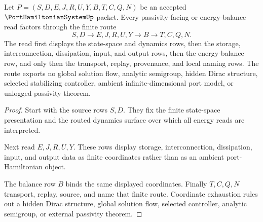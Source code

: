 \begin{theorem}
\label{thm:port-hamiltonian-system-energy-balance-route}
Let $P=(S,D,E,J,R,U,Y,B,T,C,Q,N)$ be an accepted $\PortHamiltonianSystemUp$ packet. Every passivity-facing or energy-balance read factors through the finite route
$$
S,D \longrightarrow E,J,R,U,Y \longrightarrow B \longrightarrow T,C,Q,N .
$$
The read first displays the state-space and dynamics rows, then the storage, interconnection, dissipation, input, and output rows, then the energy-balance row, and only then the transport, replay, provenance, and local naming rows. The route exports no global solution flow, analytic semigroup, hidden Dirac structure, selected stabilizing controller, ambient infinite-dimensional port model, or unlogged passivity theorem.
\end{theorem}
\begin{proof}
Start with the source rows $S,D$. They fix the finite state-space presentation and the routed dynamics surface over which all energy reads are interpreted.

Next read $E,J,R,U,Y$. These rows display storage, interconnection, dissipation, input, and output data as finite coordinates rather than as an ambient port-Hamiltonian object.

The balance row $B$ binds the same displayed coordinates. Finally $T,C,Q,N$ transport, replay, source, and name that finite route. Coordinate exhaustion rules out a hidden Dirac structure, global solution flow, selected controller, analytic semigroup, or external passivity theorem.
\end{proof}




